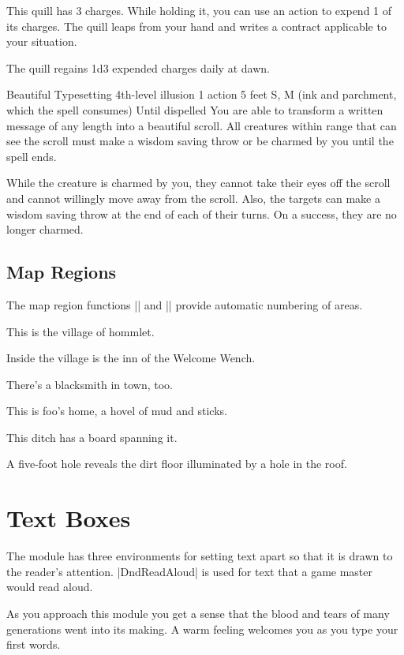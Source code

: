 \documentclass[letterpaper, twocolumn, openany, nodeprecatedcode, layout=true]{dndbook}
\begin{document}
This quill has 3 charges. While holding it, you can use an action to expend 1 of its charges. The quill leaps from your hand and writes a contract applicable to your situation.

The quill regains 1d3 expended charges daily at dawn.

\DndSpellHeader%
  {Beautiful Typesetting}
  {4th-level illusion}
  {1 action}
  {5 feet}
  {S, M (ink and parchment, which the spell consumes)}
  {Until dispelled}
You are able to transform a written message of any length into a beautiful scroll. All creatures within range that can see the scroll must make a wisdom saving throw or be charmed by you until the spell ends.

While the creature is charmed by you, they cannot take their eyes off the scroll and cannot willingly move away from the scroll. Also, the targets can make a wisdom saving throw at the end of each of their turns. On a success, they are no longer charmed.

\section{Map Regions}
The map region functions |\DndArea| and |\DndSubArea| provide automatic numbering of areas.

This is the village of hommlet.

Inside the village is the inn of the Welcome Wench.

There's a blacksmith in town, too.

This is foo's home, a hovel of mud and sticks.

This ditch has a board spanning it.

A five-foot hole reveals the dirt floor illuminated by a hole in the roof.

\chapter{Text Boxes}

The module has three environments for setting text apart so that it is drawn to the reader's attention. |DndReadAloud| is used for text that a game master would read aloud.

\begin{DndReadAloud}
  As you approach this module you get a sense that the blood and tears of many generations went into its making. A warm feeling welcomes you as you type your first words.
\end{DndReadAloud}
\end{document}

